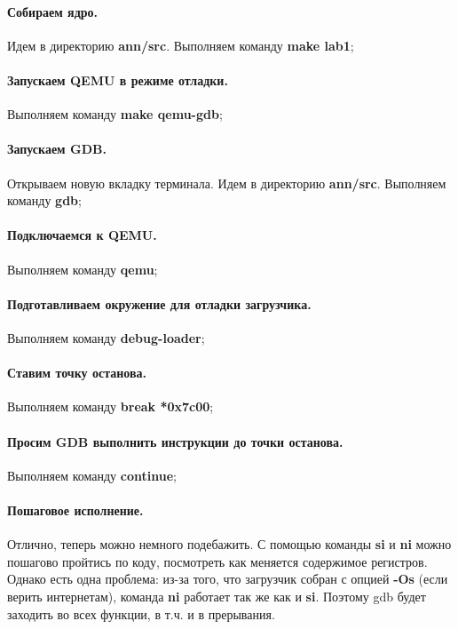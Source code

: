\paragraph{Собираем ядро.} Идем в директорию \textbf{ann/src}. Выполняем команду \textbf{make lab1};

\paragraph{Запускаем QEMU в режиме отладки.} Выполняем команду \textbf{make qemu-gdb};

\paragraph{Запускаем GDB.} Открываем новую вкладку терминала. Идем в директорию
\textbf{ann/src}. Выполняем команду \textbf{gdb};

\paragraph{Подключаемся к QEMU.} Выполняем команду \textbf{qemu};

\paragraph{Подготавливаем окружение для отладки загрузчика.} Выполняем команду \textbf{debug-loader};

\paragraph{Ставим точку останова.} Выполняем команду \textbf{break *0x7c00};

\paragraph{Просим GDB выполнить инструкции до точки останова.} Выполняем команду \textbf{continue};

\paragraph{Пошаговое исполнение.} Отлично, теперь можно немного подебажить. С
помощью команды \textbf{si} и \textbf{ni} можно пошагово пройтись по коду,
посмотреть как меняется содержимое регистров. Однако есть одна проблема: из-за
того, что загрузчик собран с опцией \textbf{-Os} (если верить интернетам),
команда \textbf{ni} работает так же как и \textbf{si}. Поэтому gdb будет
заходить во всех функции, в т.ч. и в прерывания.

